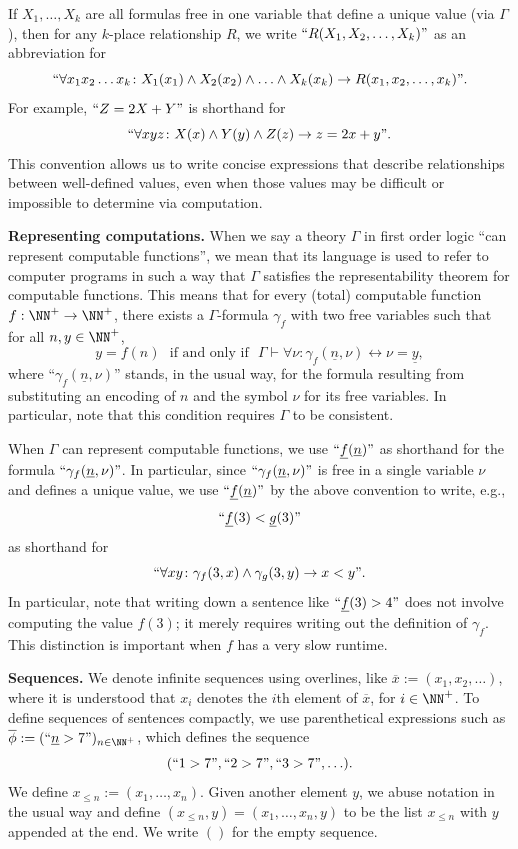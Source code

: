 \documentclass[authordate,onecolumn,noenvironments]{miri-tech-article}
\numberwithin{equation}{subsection}
\renewcommand{\implies}{\rightarrow}
\renewcommand{\iff}{\leftrightarrow}
\newcommand{\quot}[1]{``#1"}
\newcommand{\enc}[1]{{\underline{#1}}}
\newcommand{\seq}[1]{{\overline{#1}}}
\newcommand{\LUV}[1]{#1}%
\newcommand{\nn}{n}
\newcommand{\phis}{\seq{\phi}}
\newcommand{\representscomputations}{can represent computable functions}
\newcommand{\tinysection}[1]{\medskip\noindent\textbf{#1.}}
\newcommand{\append}{,}
\newcommand{\Theory}{\Gamma}
\begin{document}
If $\LUV{X}_1, \ldots, \LUV{X}_k$ are all formulas free in one variable that define a unique value (via $\Theory$), then for any $k$-place relationship $R$, we write
$
\quot{R(\LUV{X}_1,\LUV{X}_2,\ldots,\LUV{X}_k)}
$
as an abbreviation for
\[
  \quot{\forall x_1x_2\ldots x_k \colon \LUV{X}_1(x_1) \land \LUV{X}_2(x_2) \land \ldots \land \LUV{X}_k(x_k) \to
  R(x_1, x_2, \ldots, x_k)}.
\]
For example,
$\quot{\LUV{Z}=2\LUV{X}+Y}$ 
is shorthand for
\[
  \quot{\forall xyz \colon \LUV{X}(x) \wedge \LUV{Y}(y) \wedge \LUV{Z}(z) \implies z = 2x+y}.
\]
This convention allows us to write concise expressions that describe relationships between well-defined values, even when those values may be difficult or impossible to determine via computation.  

\tinysection{Representing computations} When we say a theory $\Theory$ in first order logic ``\representscomputations'', we mean that its language is used to refer to computer programs in such a way that $\Theory$ satisfies the representability theorem for computable functions.  This means that for every (total) computable function $f : \NN^+ \to \NN^+$, there exists a $\Theory$-formula $\gamma_f$ with two free variables such that for all $\nn,y\in\NN^+$, 
\[
  y=f(\nn) \text{~ if and only if ~} \Theory \vdash \forall \nu \colon \gamma_f(\enc \nn,\nu) \iff \nu = \enc{y},
\]
where ``$\gamma_f(\enc{\nn},\nu)$'' stands, in the usual way, for the formula resulting from substituting an encoding of $\nn$ and the symbol $\nu$ for its free variables.  In particular, note that this condition requires $\Theory$ to be consistent.

When $\Theory$ \representscomputations, we use $\quot{\enc{f}(\enc{n})}$ as shorthand for the formula $\quot{\gamma_f(\enc{n}, \nu)}$.   In particular, since $\quot{\gamma_f(\enc{n}, \nu)}$ is free in a single variable $\nu$ and defines a unique value,  we use $\quot{\enc{f}(\enc{n})}$ by the above convention to write, e.g.,
\[
{\quot{\enc{f}(3) < \enc{g}(3)}}
\]
as shorthand for
\[
  \quot{\forall xy \colon \gamma_f(3, x) \land \gamma_g(3, y) \to x < y}.
\]
In particular, note that writing down a sentence like $\quot{\enc{f}(3) > 4}$ does not involve computing the value $f(3)$; it merely requires writing out the definition of $\gamma_f$. This distinction is important when $f$ has a very slow runtime.

\tinysection{Sequences} We denote infinite sequences using overlines, like $\seq{x} := (x_1, x_2, \ldots)$, where it is understood that $x_i$ denotes the $i$th element of $\seq{x}$, for $i\in {\NN^+}$. To define sequences of sentences compactly, we use parenthetical expressions such as $\phis := (\quot{\enc{n} > 7})_{\nn\in {\NN^+}}$, which defines the sequence
\[
  (\quot{1 > 7}, \quot{2 > 7}, \quot{3 > 7}, \ldots).
\]
We define ${x_{\le n} := (x_1, \ldots, x_n)}$. Given another element $y$, we abuse notation in the usual way and define $(x_{\le \nn}\append y) = (x_1,\ldots,x_n, y)$ to be the list $x_{\le n}$ with $y$ appended at the end. We write $()$ for the empty sequence.
\end{document}
